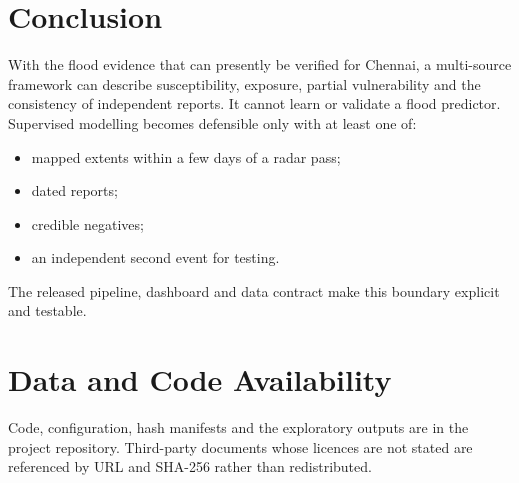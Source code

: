 \documentclass[conference]{IEEEtran}
\begin{document}
\section{Conclusion}
With the flood evidence that can presently be verified for Chennai, a multi-source framework can describe susceptibility, exposure, partial vulnerability and the consistency of independent reports. It cannot learn or validate a flood predictor. Supervised modelling becomes defensible only with at least one of:
\begin{itemize}
\item mapped extents within a few days of a radar pass;
\item dated reports;
\item credible negatives;
\item an independent second event for testing.
\end{itemize}
The released pipeline, dashboard and data contract make this boundary explicit and testable.

\section*{Data and Code Availability}
Code, configuration, hash manifests and the exploratory outputs are in the project repository. Third-party documents whose licences are not stated are referenced by URL and SHA-256 rather than redistributed.



\end{document}
